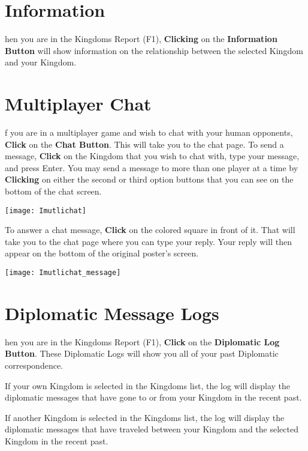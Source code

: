 \section{\textsf{Information}}

hen you are in the Kingdoms Report (F1), \textbf{Clicking} on the \textbf{Information Button} will show information on the relationship between the selected Kingdom and your Kingdom.

\section{\textsf{Multiplayer Chat}}


f you are in a multiplayer game and wish to chat with your human opponents, \textbf{Click} on the \textbf{Chat Button}. This will take you to the chat page. To send a message, \textbf{Click} on the Kingdom that you wish to chat with, type your message, and press Enter. You may send a message to more than one player at a time by \textbf{Clicking} on either the second or third option buttons that you can see on the bottom of the chat screen.

\begin{center}
    \texttt{[image: Imutlichat]} %
\end{center}

To answer a chat message, \textbf {Click} on the colored square in front of it. That will take you to the chat page where you can type your reply. Your reply will then appear on the bottom of the original poster’s screen.

\begin{center}
    \texttt{[image: Imutlichat\_message]} %
\end{center}

\section{\textsf{Diplomatic Message Logs}}


hen you are in the Kingdoms Report (F1), \textbf{Click} on the \textbf{Diplomatic Log Button}. These Diplomatic Logs will show you all of your past Diplomatic correspondence.

If your own Kingdom is selected in the Kingdoms list, the log will display the diplomatic messages that have gone to or from your Kingdom in the recent past.

If another Kingdom is selected in the Kingdoms list, the log will display the diplomatic messages that have traveled between your Kingdom and the selected Kingdom in the recent past.